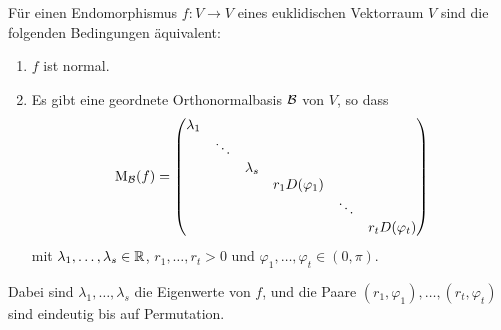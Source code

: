 \begin{theorem}
  Für einen Endomorphismus $f \colon V \to V$ eines euklidischen Vektorraum $V$ sind die folgenden Bedingungen äquivalent:
  \begin{enumerate}[leftmargin=*, label=\roman*)]
    \item
      $f$ ist normal.
    \item
      Es gibt eine geordnete Orthonormalbasis $\mathcal{B}$ von $V$, so dass
      \[
        \mathrm{M}_{\mathcal{B}}(f)
        =
        \begin{pmatrix}
          \lambda_1 &         &           &                   &         &                   \\
                    & \ddots  &           &                   &         &                   \\
                    &         & \lambda_s &                   &         &                   \\
                    &         &           & r_1 D(\varphi_1)  &         &                   \\
                    &         &           &                   & \ddots  &                   \\
                    &         &           &                   &         & r_t D(\varphi_t)
        \end{pmatrix}
      \]
      mit $\lambda_1, \dotsc, \lambda_s \in \mathbb{R}$, $r_1, \dotsc, r_t > 0$ und $\varphi_1, \dotsc, \varphi_t \in (0, \pi)$.
  \end{enumerate}
  Dabei sind $\lambda_1, \dotsc, \lambda_s$ die Eigenwerte von $f$, und die Paare $(r_1, \varphi_1), \dotsc, (r_t, \varphi_t)$ sind eindeutig bis auf Permutation.
\end{theorem}


